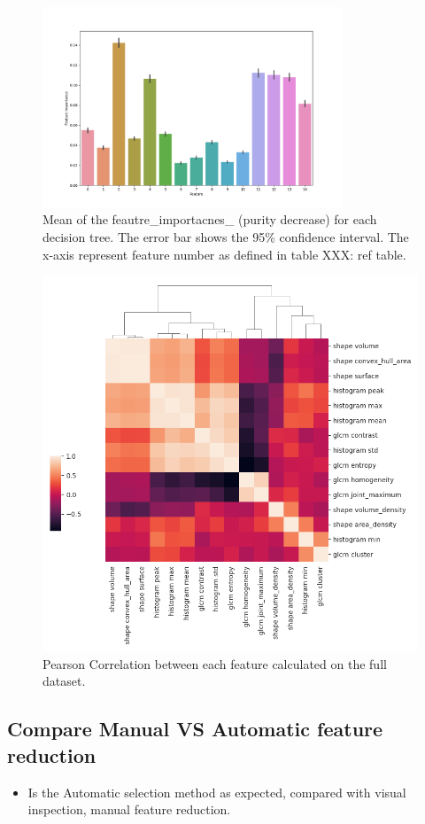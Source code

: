 

\begin{figure}[H]
    \centering
    \includegraphics[width=0.8\textwidth]{Figures/feature_importance.png}
    \caption{Mean of the feautre\_importacnes\_ (purity decrease) for each decision tree. The
    error bar shows the 95\% confidence interval. The x-axis represent feature
    number as defined in table XXX: ref table.  }  
    \label{fig:feature_importance} 
\end{figure}


\begin{figure}[H]
    \centering
    \includegraphics[width=1\textwidth]{Figures/feature_correlation.png}
    \caption{Pearson Correlation between each feature calculated on the full
    dataset. }  
\end{figure}





\subsection{Compare Manual VS Automatic feature reduction}
\begin{itemize}
    \item Is the Automatic selection method as expected, compared with visual
        inspection, manual feature reduction.   
\end{itemize}





